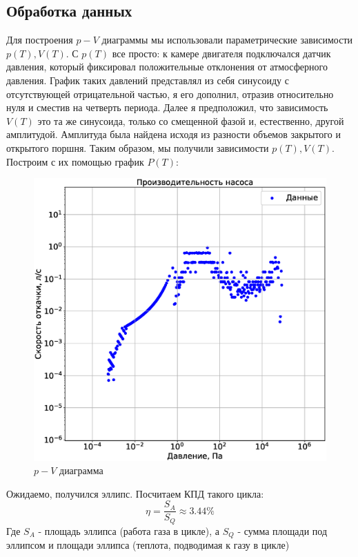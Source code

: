 \documentclass[a4paper,14pt]{extarticle}
\begin{document}
		\subsection{Обработка данных}
			Для построения $p-V$ диаграммы мы использовали параметрические зависимости $p(T), V(T)$. С $p(T)$ все просто: к камере двигателя подключался датчик давления, который фиксировал положительные отклонения от атмосферного давления. График таких давлений представлял из себя синусоиду с отсутствующей отрицательной частью, я его дополнил, отразив относительно нуля и сместив на четверть периода. Далее я предположил, что зависимость $V(T)$ это та же синусоида, только со смещенной фазой и, естественно, другой амплитудой. Амплитуда была найдена исходя из разности объемов закрытого и открытого поршня. Таким образом, мы получили зависимости $p(T), V(T)$. Построим с их помощью график $P(T)$:
			\begin{figure}[h!]
				\centering
				\includegraphics[width=.85\linewidth]{Lab4_1.eps}
				\caption{$p-V$ диаграмма}
				\label{fig6}
			\end{figure}
		
			Ожидаемо, получился эллипс. Посчитаем КПД такого цикла:
			\begin{equation}
				\eta = \frac{S_A}{S_Q} \approx 3.44 \%
			\end{equation}
			Где $S_A$ - площадь эллипса (работа газа в цикле), а $S_Q$ - сумма площади под эллипсом и площади эллипса (теплота, подводимая к газу в цикле)
\end{document}
